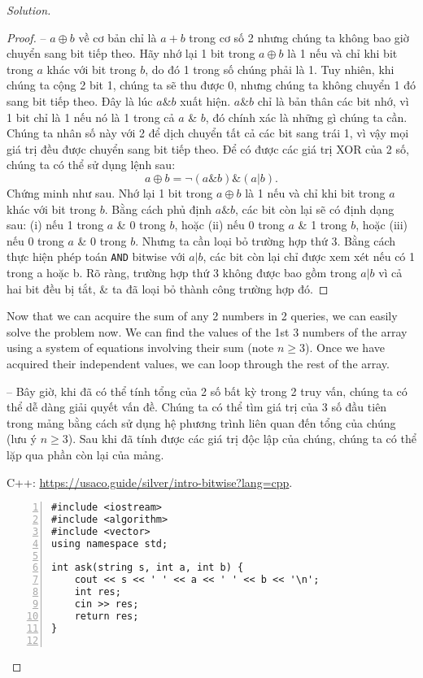 \documentclass{article}
\begin{document}
\begin{proof}[Solution]
\begin{proof}[Proof]
        -- $a\oplus b$ về cơ bản chỉ là $a + b$ trong cơ số 2 nhưng chúng ta không bao giờ chuyển sang bit tiếp theo. Hãy nhớ lại 1 bit trong $a\oplus b$ là 1 nếu và chỉ khi bit trong $a$ khác với bit trong $b$, do đó 1 trong số chúng phải là 1. Tuy nhiên, khi chúng ta cộng 2 bit 1, chúng ta sẽ thu được 0, nhưng chúng ta không chuyển 1 đó sang bit tiếp theo. Đây là lúc $a\&b$ xuất hiện. $a\&b$ chỉ là bản thân các bit nhớ, vì 1 bit chỉ là 1 nếu nó là 1 trong cả $a$ \& $b$, đó chính xác là những gì chúng ta cần. Chúng ta nhân số này với 2 để dịch chuyển tất cả các bit sang trái 1, vì vậy mọi giá trị đều được chuyển sang bit tiếp theo. Để có được các giá trị XOR của 2 số, chúng ta có thể sử dụng lệnh sau:
        \begin{equation*}
            a\oplus b = \neg(a\&b)\&(a|b).
        \end{equation*}
        Chứng minh như sau. Nhớ lại 1 bit trong $a\oplus b$ là 1 nếu và chỉ khi bit trong $a$ khác với bit trong $b$. Bằng cách phủ định $a\&b$, các bit còn lại sẽ có định dạng sau: (i) nếu 1 trong $a$ \& 0 trong $b$, hoặc (ii) nếu 0 trong $a$ \& 1 trong $b$, hoặc (iii) nếu 0 trong $a$ \& 0 trong $b$. Nhưng ta cần loại bỏ trường hợp thứ 3. Bằng cách thực hiện phép toán {\tt AND} bitwise với $a|b$, các bit còn lại chỉ được xem xét nếu có 1 trong a hoặc b. Rõ ràng, trường hợp thứ 3 không được bao gồm trong $a|b$ vì cả hai bit đều bị tắt, \& ta đã loại bỏ thành công trường hợp đó.
    \end{proof}
    Now that we can acquire the sum of any 2 numbers in 2 queries, we can easily solve the problem now. We can find the values of the 1st 3 numbers of the array using a system of equations involving their sum (note $n\ge3$). Once we have acquired their independent values, we can loop through the rest of the array.

    -- Bây giờ, khi đã có thể tính tổng của 2 số bất kỳ trong 2 truy vấn, chúng ta có thể dễ dàng giải quyết vấn đề. Chúng ta có thể tìm giá trị của 3 số đầu tiên trong mảng bằng cách sử dụng hệ phương trình liên quan đến tổng của chúng (lưu ý $n\ge3$). Sau khi đã tính được các giá trị độc lập của chúng, chúng ta có thể lặp qua phần còn lại của mảng.

    C++: \url{https://usaco.guide/silver/intro-bitwise?lang=cpp}.
    \begin{Verbatim}[numbers=left,xleftmargin=5mm]
#include <iostream>
#include <algorithm>
#include <vector>
using namespace std;

int ask(string s, int a, int b) {
    cout << s << ' ' << a << ' ' << b << '\n';
    int res;
    cin >> res;
    return res;
}


\end{Verbatim}
\end{proof}
\end{document}
